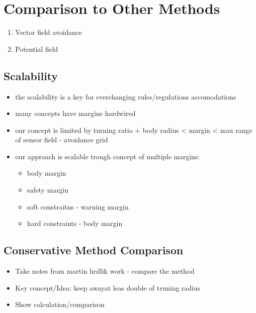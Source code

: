 \section{Comparison to Other Methods}\label{s:OtherMethodsComparison}

\begin{enumerate}
	\item Vector field avoidance \cite{borenstein1991vector}
	\item Potential field \cite{koren1991potential}
\end{enumerate}

\subsection{Scalability}\label{s:conclusionScalability}

\begin{itemize}
    \item the scalability is a key for everchanging rules/regulations accomodations
    
    \item many concepts have margins hardwired
    
    \item our concept is limited by turning ratio + body radius < margin < max range of sensor field - avoidance grid
    
    \item our approach is scalable trough concept of multiple  margins:
    \begin{itemize}
        \item body margin
        \item safety margin
        \item soft constraitns - warning margin
        \item hard constraints - body margin
    \end{itemize}
    
\end{itemize}

\subsection{Conservative Method Comparison}\label{s:conservativeComparison}
\begin{itemize}
    \item Take notes from martin hrdlik work - compare the method 
    \item Key concept/Idea: keep awayat leas double of truning radius
    \item Show calculation/comparison
\end{itemize}

